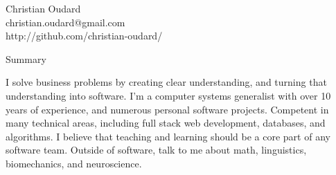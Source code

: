 \documentclass[11pt,oneside]{article}
\begin{document}
\begin{center}
    \textrm{\Huge Christian Oudard} \\
    \vspace{4pt}
    \textsf{
        christian.oudard@gmail.com \\
        http://github.com/christian-oudard/
    }
\end{center}
\vspace{8pt} 

\textrm{\Large Summary}\par
\vspace{8pt}
\textsf{I solve business problems by creating clear understanding, and turning that understanding into software. I'm a computer systems generalist with over 10 years of experience, and numerous personal software projects. Competent in many technical areas, including full stack web development, databases, and algorithms. I believe that teaching and learning should be a core part of any software team. Outside of software, talk to me about math, linguistics, biomechanics, and neuroscience.}

\vspace{12pt}
\end{document}
